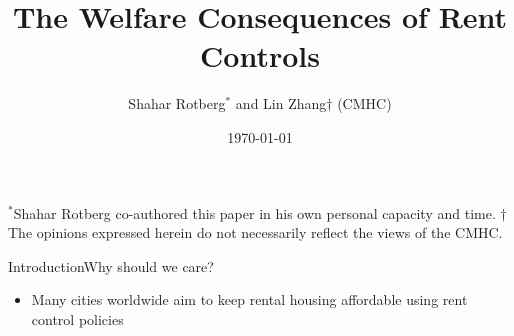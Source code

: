 \documentclass[11pt,aspectratio=169]{beamer}
\title{The Welfare Consequences of Rent Controls}
\date{\today}
\author{Shahar Rotberg$^*$ and Lin Zhang$\dagger$ (CMHC)}
\begin{document}
\begin{frame}
\maketitle
 
 \vspace{1cm}
{\footnotesize $^*$Shahar Rotberg co-authored this paper in his own personal capacity and time. $\dagger$The opinions expressed herein do not necessarily reflect the views of the CMHC.}
\end{frame}

\begin{frame}{Introduction}{Why should we care?}

\vspace{-0.75cm}

\begin{itemize}
    \item Many cities worldwide aim to keep rental housing affordable using rent control policies 
\end{itemize}     

\end{frame}

\end{document}
